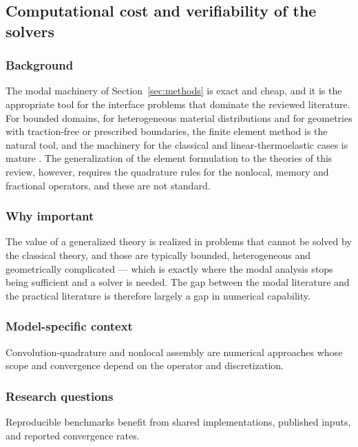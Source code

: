 \subsection{Computational cost and verifiability of the solvers}
\label{sec:15.10}

\subsubsection{Background}

The modal machinery of Section~\ref{sec:methods} is exact and cheap, and it is the appropriate tool for the interface problems that dominate the reviewed literature. For bounded domains, for heterogeneous material distributions and for geometries with traction-free or prescribed boundaries, the finite element method is the natural tool, and the machinery for the classical and linear-thermoelastic cases is mature \cite{Hughes1980}. The generalization of the element formulation to the theories of this review, however, requires the quadrature rules for the nonlocal, memory and fractional operators, and these are not standard.

\subsubsection{Why important}

The value of a generalized theory is realized in problems that cannot be solved by the classical theory, and those are typically bounded, heterogeneous and geometrically complicated --- which is exactly where the modal analysis stops being sufficient and a solver is needed. The gap between the modal literature and the practical literature is therefore largely a gap in numerical capability.

\subsubsection{Model-specific context}

Convolution-quadrature and nonlocal assembly are numerical approaches whose scope and convergence depend on the operator and discretization.

\subsubsection{Research questions}

Reproducible benchmarks benefit from shared implementations, published inputs, and reported convergence rates.

